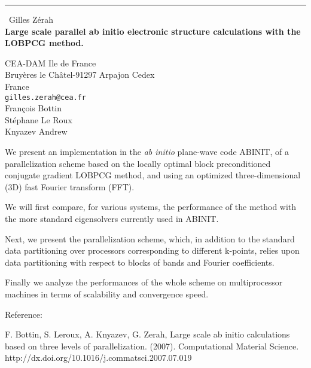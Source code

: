 \documentclass{report}
\begin{document}
\begin{center}
\rule{6in}{1pt} \
{\large Gilles Z\'{e}rah \\
{\bf Large scale parallel ab initio electronic structure calculations with the LOBPCG method.}}

CEA-DAM Ile de France \\ Bruy\`{e}res le Ch\^{a}tel-91297 Arpajon Cedex \\ France
\\
{\tt gilles.zerah@cea.fr}\\
Fran\c{c}ois Bottin\\
St\'{e}phane Le Roux\\
	Knyazev Andrew\end{center}

We present an implementation in the {\it ab initio} plane-wave code
ABINIT, of a parallelization scheme based on the locally optimal block
preconditioned conjugate gradient LOBPCG method, and using an optimized
three-dimensional (3D) fast Fourier transform (FFT).

We will first compare, for various systems, the performance of the method
with the more standard eigensolvers currently used in ABINIT.

Next, we present the parallelization scheme, which, in addition to the
standard data partitioning over processors corresponding to different
k-points, relies upon data partitioning with respect to blocks of bands
and Fourier coefficients.

Finally we analyze the performances of the whole scheme on multiprocessor
machines in terms of scalability and convergence speed.


Reference:

F. Bottin, S. Leroux, A. Knyazev, G. Zerah, Large scale ab initio
calculations based on three levels of parallelization. (2007).
Computational Material Science.
http://dx.doi.org/10.1016/j.commatsci.2007.07.019
\end{document}

